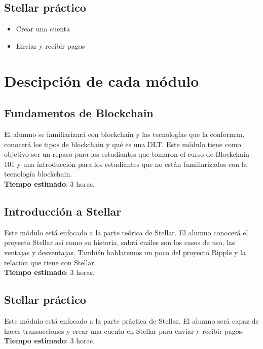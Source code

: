 \documentclass[a4paper,12pt]{/home/armando/Documentos/Cursos/LaTeX/Plantillas/lib/pub}
\begin{document}
	\subsection{Stellar práctico}
	\begin{itemize}
		\item Crear una cuenta
		\item Enviar y recibir pagos
	\end{itemize}

\section{Descipción de cada módulo}
	\subsection{Fundamentos de Blockchain}
	El alumno se familiarizará con blockchain y las tecnologías que la conforman, conocerá los tipos de blockchain y qué es una DLT. Este módulo tiene como objetivo ser un repaso para los estudiantes que tomaron el curso de Blockchain 101 y una introducción para los estudiantes que no están familiarizados con la tecnología blockchain.\\
	\textbf{Tiempo estimado}: 3 horas.
	\subsection{Introducción a Stellar}
	Este módulo está enfocado a la parte teórica de Stellar. El alumno conocerá el proyecto Stellar así como su historia, sabrá cuáles son los casos de uso, las ventajas y desventajas. También hablaremos un poco del proyecto Ripple y la relación que tiene con Stellar.\\
	\textbf{Tiempo estimado}: 3 horas.
	\subsection{Stellar práctico}
	Este módulo está enfocado a la parte práctica de Stellar. El alumno será capaz de hacer transacciones y crear una cuenta en Stellar para enviar y recibir pagos.\\
	\textbf{Tiempo estimado}: 3 horas.
\end{document}
